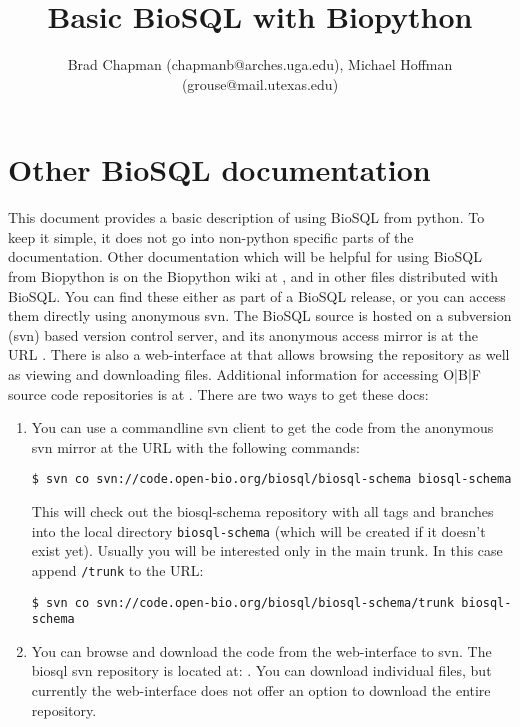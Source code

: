 \documentclass{article}
\begin{document}
\title{Basic BioSQL with Biopython}
\author{Brad Chapman (chapmanb@arches.uga.edu), Michael Hoffman
(grouse@mail.utexas.edu)}

\maketitle
\tableofcontents

\section{Other BioSQL documentation}

This document provides a basic description of using BioSQL from
python. To keep it simple, it does not go into non-python specific parts
of the documentation. Other documentation which will be helpful for
using BioSQL from Biopython is on the Biopython wiki at , and in other files distributed with BioSQL. You can find these either as part of a BioSQL release, or you can access them directly using anonymous svn. The BioSQL source is hosted on a subversion (svn) based version control server, and its anonymous access mirror is at the URL . There is also a web-interface at  that allows browsing the repository as well as viewing and downloading files. Additional information for accessing O|B|F source code repositories is at . There are two ways to get these
docs:

\begin{enumerate}
\item You can use a commandline svn client to get the code from the
  anonymous svn mirror at the URL
   with
  the following commands:

\begin{verbatim}
$ svn co svn://code.open-bio.org/biosql/biosql-schema biosql-schema
\end{verbatim}

  This will check out the biosql-schema repository with all tags and
  branches into the local directory \verb|biosql-schema| (which will
  be created if it doesn't exist yet). Usually you will be interested
  only in the main trunk. In this case append \verb|/trunk| to the
  URL:

\begin{verbatim}
$ svn co svn://code.open-bio.org/biosql/biosql-schema/trunk biosql-schema
\end{verbatim}

\item You can browse and download the code from the web-interface to
svn. The biosql svn repository is located at:
. You can download individual files, but currently the web-interface does not offer an option to download the entire repository.
\end{enumerate}
\end{document}
